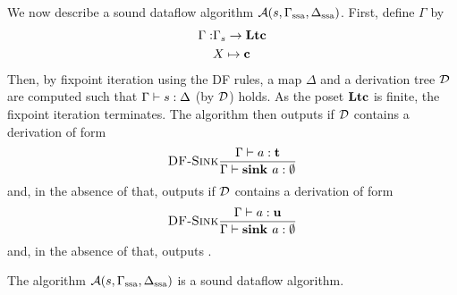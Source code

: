 We now describe a sound dataflow algorithm $\operatorname{\mathcal{A}}(s, \Gamma_\text{ssa}, \Delta_\text{ssa})$.
First, define $\Gamma$ by
\begin{align*}
    \Gamma: &\Gamma_s \to \textbf{Ltc}\\
    &X \mapsto \textbf{c}
\end{align*}
Then, by fixpoint iteration using the DF rules, a map $\Delta$ and a derivation tree $\operatorname{\mathcal{D}}$ 
are computed such that
$\Gamma \vdash {s}: \Delta$ (by $\operatorname{\mathcal{D}}$) holds.
As the poset $\textbf{Ltc}$ is finite, the fixpoint iteration terminates.
The algorithm then outputs  if $\operatorname{\mathcal{D}}$ contains a derivation of form
\begin{equation*}
    \textsc{DF-Sink}\frac{\displaystyle \Gamma \vdash {a}: \textbf{t}}{\displaystyle \Gamma \vdash {\textbf{sink }{a}}: \emptyset}
\end{equation*}
and, in the absence of that, outputs  if $\operatorname{\mathcal{D}}$ contains a derivation of form
\begin{equation*}
    \textsc{DF-Sink}\frac{\displaystyle \Gamma \vdash {a}: \textbf{u}}{\displaystyle \Gamma \vdash {\textbf{sink }{a}}: \emptyset}
\end{equation*}
and, in the absence of that, outputs .

\begin{corollary}
    The algorithm $\operatorname{\mathcal{A}}(s, \Gamma_\text{ssa}, \Delta_\text{ssa})$ is a sound dataflow algorithm.
\end{corollary}
